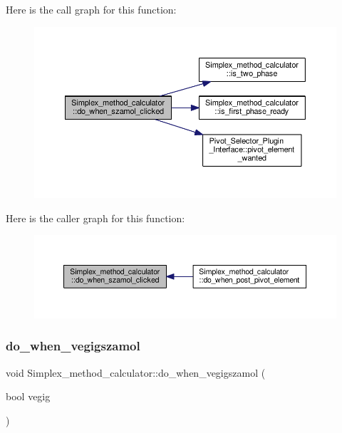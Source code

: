 Here is the call graph for this function\+:\nopagebreak
\begin{figure}[H]
\begin{center}
\leavevmode
\includegraphics[width=350pt]{classSimplex__method__calculator_aac8e0f77b94815c04834b226637b0d6a_cgraph}
\end{center}
\end{figure}
Here is the caller graph for this function\+:\nopagebreak
\begin{figure}[H]
\begin{center}
\leavevmode
\includegraphics[width=350pt]{classSimplex__method__calculator_aac8e0f77b94815c04834b226637b0d6a_icgraph}
\end{center}
\end{figure}
\mbox{\label{classSimplex__method__calculator_aa87a06777c60b6c3b9b78df37da2b648}} 
\subsubsection{\texorpdfstring{do\+\_\+when\+\_\+vegigszamol}{do\_when\_vegigszamol}}
{\footnotesize\ttfamily void Simplex\+\_\+method\+\_\+calculator\+::do\+\_\+when\+\_\+vegigszamol (\begin{DoxyParamCaption}\item[{bool}]{vegig }\end{DoxyParamCaption})\hspace{0.3cm}{\ttfamily [slot]}}



